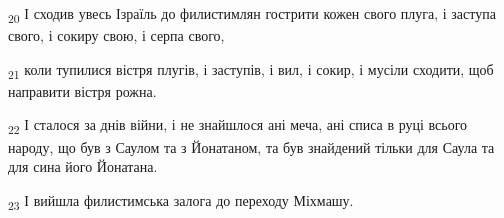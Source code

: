 \begin{tcolorbox}
\textsubscript{20} І сходив увесь Ізраїль до филистимлян гострити кожен свого плуга, і заступа свого, і сокиру свою, і серпа свого,
\end{tcolorbox}
\begin{tcolorbox}
\textsubscript{21} коли тупилися вістря плугів, і заступів, і вил, і сокир, і мусіли сходити, щоб направити вістря рожна.
\end{tcolorbox}
\begin{tcolorbox}
\textsubscript{22} І сталося за днів війни, і не знайшлося ані меча, ані списа в руці всього народу, що був з Саулом та з Йонатаном, та був знайдений тільки для Саула та для сина його Йонатана.
\end{tcolorbox}
\begin{tcolorbox}
\textsubscript{23} І вийшла филистимська залога до переходу Міхмашу.
\end{tcolorbox}
